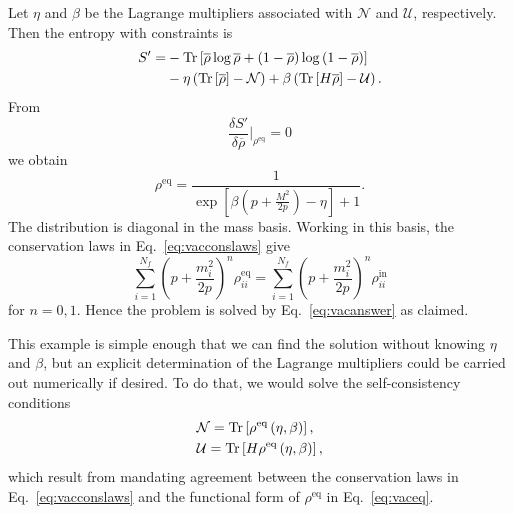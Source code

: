 \documentclass[aps,prd,twocolumn,groupedaddress,preprintnumbers]{revtex4-2}
\begin{document}
Let $\eta$ and $\beta$ be the Lagrange multipliers associated with $\mathcal{N}$ and $\mathcal{U}$, respectively. Then the entropy with constraints is
\begin{align}
S' = &- \textrm{Tr} \left[ \overline{\rho} \log \overline{\rho} + \left( 1 - \overline{\rho} \right) \log \left( 1 - \overline{\rho} \right) \right] \notag \\
&- \eta \left( \textrm{Tr} \left[ \overline{\rho} \right] - \mathcal{N} \right) + \beta \left( \textrm{Tr} \left[ H \overline{\rho} \right] - \mathcal{U} \right).
\end{align}
From
\begin{equation}
\frac{\delta S'}{\delta \overline{\rho}} \bigg|_{\rho^\textrm{eq}} = 0
\end{equation}
we obtain
\begin{equation}
\rho^\textrm{eq} = \frac{1}{\exp\left[ \beta \left( p + \frac{M^2}{2p} \right)  - \eta\right] + 1}. \label{eq:vaceq}
\end{equation}
The distribution is diagonal in the mass basis. Working in this basis, the conservation laws in Eq.~\eqref{eq:vacconslaws} give
\begin{equation}
\sum_{i=1}^{N_f} \left( p + \frac{m_i^2}{2p} \right)^n \rho_{ii}^\textrm{eq} = \sum_{i=1}^{N_f} \left( p + \frac{m_i^2}{2p} \right)^n \rho_{ii}^\textrm{in}
\end{equation}
for $n = 0, 1$. Hence the problem is solved by Eq.~\eqref{eq:vacanswer} as claimed.

This example is simple enough that we can find the solution without knowing $\eta$ and  $\beta$, but an explicit determination of the Lagrange multipliers could be carried out numerically if desired. To do that, we would solve the self-consistency conditions
\begin{align}
&\mathcal{N} = \textrm{Tr} \left[ \rho^\textrm{eq} \left( \eta, \beta \right) \right], \notag \\
&\mathcal{U} = \textrm{Tr} \left[ H \rho^\textrm{eq} \left( \eta, \beta \right) \right],
\end{align}
which result from mandating agreement between the conservation laws in Eq.~\eqref{eq:vacconslaws} and the functional form of $\rho^\textrm{eq}$ in Eq.~\eqref{eq:vaceq}.
\end{document}
